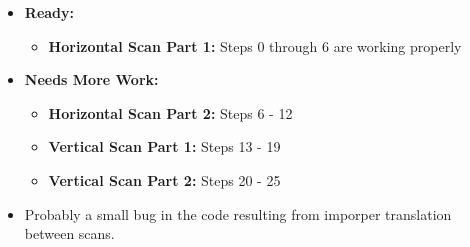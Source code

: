 \begin{frame}
\begin{columns}[onlytextwidth]
\begin{column}{0.5\textwidth}
{\begin{tabular}{c c c c c}
  \bottomrule
  \end{tabular}
  }
\end{column}
\begin{column}{0.5\textwidth}
	\begin{itemize}
		\item\textbf{Ready:}
			\begin{itemize}
				\item \textbf{Horizontal Scan Part 1:} Steps 0 through 6 are working properly
			\end{itemize}
		\item\textbf{Needs More Work:}
				\begin{itemize}
					\item \textbf{Horizontal Scan Part 2:} Steps 6 - 12
					\item \textbf{Vertical Scan Part 1: } Steps 13 - 19
					\item \textbf{Vertical Scan Part 2: } Steps 20 - 25
				\end{itemize}
		\item Probably a small bug in the code resulting from imporper translation
			between scans.
		\end{itemize}
\end{column}
\end{columns}
\end{frame}


